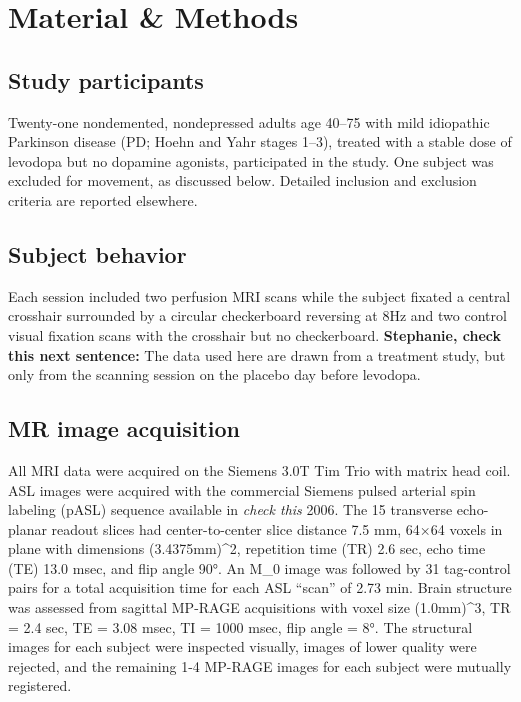 \section{Material \& Methods}

\subsection{Study participants}
Twenty-one nondemented, nondepressed adults age 40–75 with mild idiopathic Parkinson disease (PD; Hoehn and Yahr stages 1–3),\cite{6067254} treated with a stable dose of levodopa but no dopamine agonists, participated in the study. One subject was excluded for movement, as discussed below. Detailed inclusion and exclusion criteria are reported elsewhere.\cite{Black_2010}

\subsection{Subject behavior}
Each session included two perfusion MRI scans while the subject fixated a central crosshair surrounded by a circular checkerboard reversing at 8Hz and two control visual fixation scans with the crosshair but no checkerboard. \textbf{Stephanie, check this next sentence:} The data used here are drawn from a treatment study,\cite{Black_2010} but only from the scanning session on the placebo day before levodopa. 

\subsection{MR image acquisition}
All MRI data were acquired on the Siemens 3.0T Tim Trio with matrix head coil. ASL images were acquired with the commercial Siemens pulsed arterial spin labeling (pASL) sequence available in \textit{check this} 2006.\cite{Wang_2003} The 15 transverse echo-planar readout slices had center-to-center slice distance 7.5 mm, 64×64 voxels in plane with dimensions (3.4375mm)^2, repetition time (TR) 2.6 sec, echo time (TE) 13.0 msec, and flip angle 90°. An M_0 image was followed by 31 tag-control pairs for a total acquisition time for each ASL “scan” of 2.73 min. Brain structure was assessed from sagittal MP-RAGE acquisitions with voxel size (1.0mm)^3, TR = 2.4 sec, TE = 3.08 msec, TI = 1000 msec, flip angle = 8°. The structural images for each subject were inspected visually, images of lower quality were rejected, and the remaining 1-4 MP-RAGE images for each subject were mutually registered.


